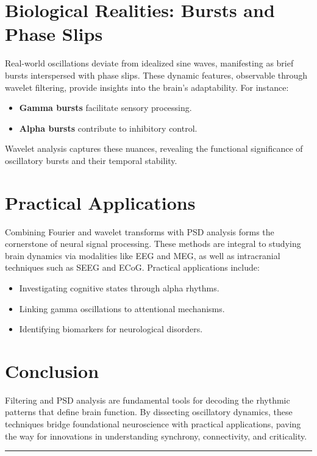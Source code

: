 \section{Biological Realities: Bursts and Phase Slips}
Real-world oscillations deviate from idealized sine waves, manifesting as brief bursts interspersed with phase slips. These dynamic features, observable through wavelet filtering, provide insights into the brain's adaptability. For instance:
\begin{itemize}
\item \textbf{Gamma bursts} facilitate sensory processing.
\item \textbf{Alpha bursts} contribute to inhibitory control.
\end{itemize}

Wavelet analysis captures these nuances, revealing the functional significance of oscillatory bursts and their temporal stability.

\section{Practical Applications}
Combining Fourier and wavelet transforms with PSD analysis forms the cornerstone of neural signal processing. These methods are integral to studying brain dynamics via modalities like EEG and MEG, as well as intracranial techniques such as SEEG and ECoG. Practical applications include:
\begin{itemize}
\item Investigating cognitive states through alpha rhythms.
\item Linking gamma oscillations to attentional mechanisms.
\item Identifying biomarkers for neurological disorders.
\end{itemize}

\section{Conclusion}
Filtering and PSD analysis are fundamental tools for decoding the rhythmic patterns that define brain function. By dissecting oscillatory dynamics, these techniques bridge foundational neuroscience with practical applications, paving the way for innovations in understanding synchrony, connectivity, and criticality.

\vspace{10pt}           %
\rule{\linewidth}{0.4pt} %
\vspace{1pt}           %

